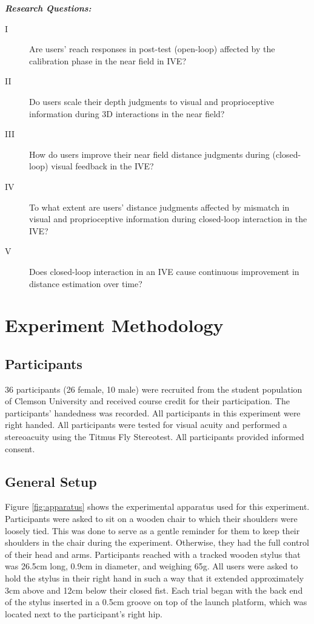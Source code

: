 \textit{\textbf{Research Questions:}} 
\begin{description}
	\item[I] Are users' reach responses in post-test (open-loop) affected by the calibration phase in the near field in IVE?
	\item[II] Do users scale their depth judgments to visual and proprioceptive information during 3D interactions in the near field?
	\item[III] How do users improve their near field distance judgments during (closed-loop) visual feedback in the IVE?
	\item[IV] To what extent are users' distance judgments affected by mismatch in visual and proprioceptive information during closed-loop interaction in the IVE?
	\item[V] Does closed-loop interaction in an IVE cause continuous improvement in distance estimation over time?
\end{description}

\section{Experiment Methodology}

\subsection{Participants}
36 participants (26 female, 10 male) were recruited from the student population of Clemson University and received course credit for their participation. The participants' handedness was recorded. All participants in this experiment were right handed. All participants were tested for visual acuity and performed a stereoacuity using the Titmus Fly Stereotest. All participants provided informed consent.

\subsection{General Setup}
Figure \ref{fig:apparatus} shows the experimental apparatus used for this experiment. Participants were asked to sit on a wooden chair to which their shoulders were loosely tied. This was done to serve as a gentle reminder for them to keep their shoulders in the chair during the experiment. Otherwise, they had the full control of their head and arms. Participants reached with a tracked wooden stylus that was 26.5cm long, 0.9cm in diameter, and weighing 65g. All users were asked to hold the stylus in their right hand in such a way that it extended approximately 3cm above and 12cm below their closed fist. Each trial began with the back end of the stylus inserted in a 0.5cm groove on top of the launch platform, which was located next to the participant's right hip.

